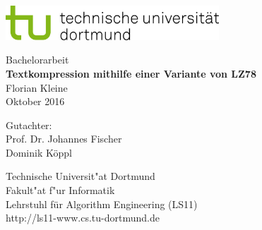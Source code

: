 \begin{titlepage}
\vspace*{-2cm}
\newlength{\links}
\setlength{\links}{-1.5cm}
\sffamily
\hspace*{\links}
\begin{minipage}{12.5cm}
\includegraphics[width=8cm]{pics/tud_logo_rgb}
\end{minipage}

\vspace*{4cm}

\hspace*{\links}
\hspace*{-0.2cm}
\begin{minipage}{9cm}
\large
\begin{center}
{\Large Bachelorarbeit} \\
\vspace*{1cm}
\textbf{Textkompression mithilfe einer Variante von LZ78} \\
\vspace*{1cm}
Florian Kleine\\
Oktober 2016
\end{center}
\end{minipage}
\normalsize
\vspace*{5.5cm}


\vspace*{2.1cm}

\hspace*{\links}
\begin{minipage}[b]{5cm}
\raggedright
Gutachter: \\
Prof. Dr. Johannes Fischer \\
Dominik Köppl \\
\end{minipage}

\vspace*{2.5cm}
\hspace*{\links}
\begin{minipage}[b]{8cm}
\raggedright
Technische Universit"at Dortmund \\
Fakult"at f"ur Informatik\\
Lehrstuhl für Algorithm Engineering (LS11)\\
http://ls11-www.cs.tu-dortmund.de
\end{minipage}

\end{titlepage}
